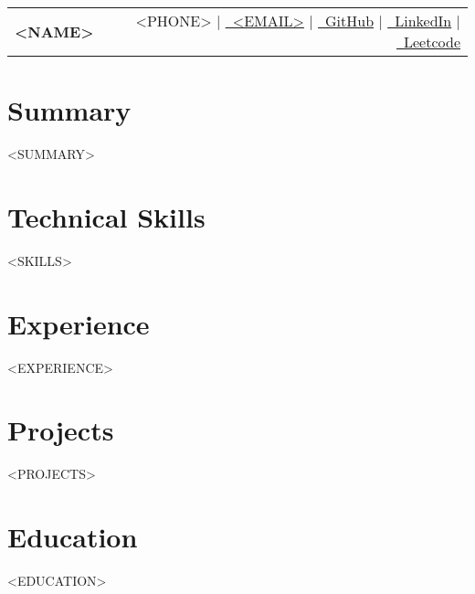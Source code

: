 \documentclass[a4paper,11pt]{article}
\begin{document}
\selectfont

\begin{tabularx}{\linewidth}{@{}L r@{}}
  \textbf{\huge <NAME>} &
  \footnotesize{\raisebox{0.0\height}{\faPhone}\ <PHONE> \quad|\quad
  \href{mailto:<EMAIL>}{\raisebox{0.0\height}{\faEnvelope}\ <EMAIL>} \quad|\quad
  \href{<GITHUB>}{\raisebox{0.0\height}{\faGithub}\ GitHub} \quad|\quad
  \href{<LINKEDIN>}{\raisebox{0.0\height}{\faLinkedin}\ LinkedIn} \quad|\quad
  \href{<LEETCODE>}{\raisebox{0.0\height}{\faLink}\ Leetcode}}
\end{tabularx}
\vspace{-1mm}

\section{\Large\textbf{Summary}}
\small{<SUMMARY>}
\vspace{-2mm}

\section{\Large\textbf{Technical Skills}}
<SKILLS>
\vspace{-12pt}

\section{\Large\textbf{Experience}}
<EXPERIENCE>
\vspace{-6mm}

\section{\Large\textbf{Projects}}
<PROJECTS>
\vspace{-3mm}

\section{\Large\textbf{Education}}
<EDUCATION>
\vspace{-3mm}
\end{document}

